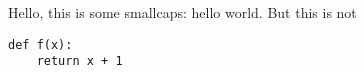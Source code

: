 \documentclass{article}
\begin{document}
Hello, this is some smallcaps: {\sc hello world}. But this is not

\begin{lstlisting}
def f(x):
    return x + 1
\end{lstlisting}
\end{document}
